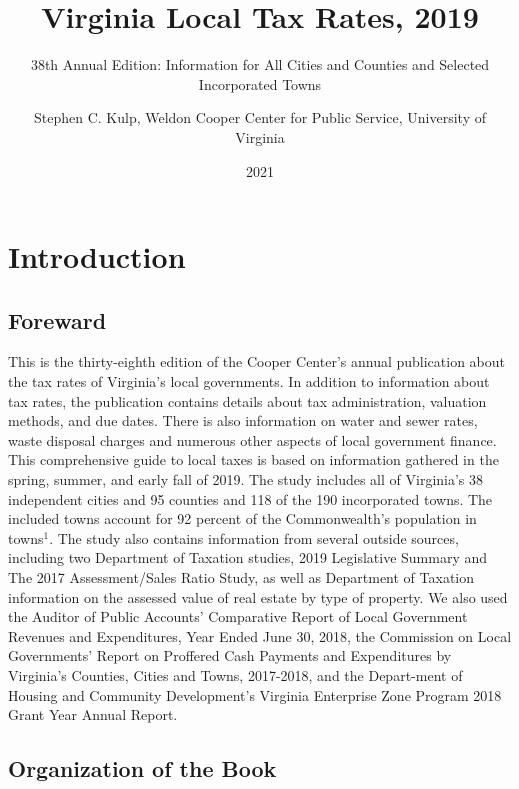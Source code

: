 \documentclass[
]{book}
\title{Virginia Local Tax Rates, 2019}
\subtitle{38th Annual Edition: Information for All Cities and Counties and Selected Incorporated Towns}
\author{Stephen C. Kulp, Weldon Cooper Center for Public Service, University of Virginia}
\date{2021}
\begin{document}
\maketitle

{
\setcounter{tocdepth}{1}
\tableofcontents
}
\hypertarget{introduction}{%
\chapter*{Introduction}\label{introduction}}

\hypertarget{foreward}{%
\section*{Foreward}\label{foreward}}

This is the thirty-eighth edition of the Cooper Center's annual publication about the tax rates of Virginia's local governments. In addition to information about tax rates, the publication contains details about tax administration, valuation methods, and due dates. There is also information on water and sewer rates, waste disposal charges and numerous other aspects of local government finance. This comprehensive guide to local taxes is based on information gathered in the spring, summer, and early fall of 2019. The study includes all of Virginia's 38 independent cities and 95 counties and 118 of the 190 incorporated towns. The included towns account for 92 percent of the Commonwealth's population in towns\(^1\). The study also contains information from several outside sources, including two Department of Taxation studies, 2019 Legislative Summary and The 2017 Assessment/Sales Ratio Study, as well as Department of Taxation information on the assessed value of real estate by type of property. We also used the Auditor of Public Accounts' Comparative Report of Local Government Revenues and Expenditures, Year Ended June 30, 2018, the Commission on Local Governments' Report on Proffered Cash Payments and Expenditures by Virginia's Counties, Cities and Towns, 2017-2018, and the Depart-ment of Housing and Community Development's Virginia Enterprise Zone Program 2018 Grant Year Annual Report.

\hypertarget{organization-of-the-book}{%
\section*{Organization of the Book}\label{organization-of-the-book}}
\end{document}
